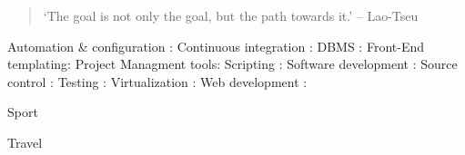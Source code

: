 
\begin{quote}
`The goal is not only the goal,
but the path towards it.' – Lao-Tseu
\end{quote}


Automation \& configuration :  
\hfill \break \break
Continuous integration :   
\hfill \break \break
DBMS :   
\hfill \break \break
Front-End templating:  
\hfill \break \break
Project Managment tools:  
\hfill \break \break
Scripting :   
\hfill \break \break
Software development :   
\hfill \break \break
Source control :    
\hfill \break \break
Testing :   
\hfill \break \break
Virtualization :   
\hfill \break \break
Web development :  


\divider

\divider



\textmd{Sport} \smallskip
{}
\divider

\textmd{Travel} \smallskip
{}

